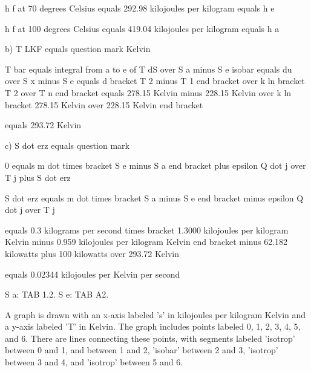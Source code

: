 h f at 70 degrees Celsius equals 292.98 kilojoules per kilogram equals h e

h f at 100 degrees Celsius equals 419.04 kilojoules per kilogram equals h a

b)
T LKF equals question mark Kelvin

T bar equals integral from a to e of T dS over S a minus S e isobar equals du over S x minus S e equals d bracket T 2 minus T 1 end bracket over k ln bracket T 2 over T n end bracket equals 278.15 Kelvin minus 228.15 Kelvin over k ln bracket 278.15 Kelvin over 228.15 Kelvin end bracket

equals 293.72 Kelvin

c)
S dot erz equals question mark

0 equals m dot times bracket S e minus S a end bracket plus epsilon Q dot j over T j plus S dot erz

S dot erz equals m dot times bracket S a minus S e end bracket minus epsilon Q dot j over T j

equals 0.3 kilograms per second times bracket 1.3000 kilojoules per kilogram Kelvin minus 0.959 kilojoules per kilogram Kelvin end bracket minus 62.182 kilowatts plus 100 kilowatts over 293.72 Kelvin

equals 0.02344 kilojoules per Kelvin per second

S a: TAB 1.2.
S e: TAB A2.

A graph is drawn with an x-axis labeled 's' in kilojoules per kilogram Kelvin and a y-axis labeled 'T' in Kelvin. The graph includes points labeled 0, 1, 2, 3, 4, 5, and 6. There are lines connecting these points, with segments labeled 'isotrop' between 0 and 1, and between 1 and 2, 'isobar' between 2 and 3, 'isotrop' between 3 and 4, and 'isotrop' between 5 and 6.